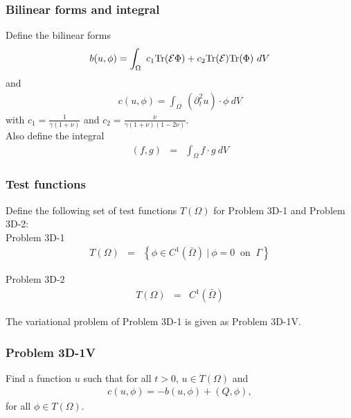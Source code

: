 \documentclass[../../main.tex]{subfiles}ite{VS18}
\begin{document}
\subsubsection{Bilinear forms and integral}\label{sssec:3D_Model:BilinearForm}
Define the bilinear forms
\begin{eqnarray}
	b(u,\phi) = \int_\Omega~c_1\textrm{Tr}({\cal E}\Phi)+ c_2\textrm{Tr}({\cal E})
	\textrm{Tr}(\Phi) ~dV \label{eq:3D_Model:Bilinear}
\end{eqnarray}\label{sym:b}
and
\begin{eqnarray}
	c(u,\phi) = \int_\Omega~ (\partial^2_t u) \cdot \phi~dV \label{eq:3D_Model:Bilinear_c}
\end{eqnarray}
with $\displaystyle c_1 = \frac{1}{\gamma(1+\nu)}$ and $\displaystyle c_2 = \frac{\nu}{\gamma(1+\nu)(1-2\nu)}$.\\

Also define the integral
\begin{eqnarray}
	(f,g) &=& \int_{\Omega} f\cdot g \ dV \label{eq:3D_Model:Bilinear_int}
\end{eqnarray}

\subsubsection{Test functions}\label{sssec:3D_Model:TestFunction}
Define the following set of test functions $T(\Omega)$ for Problem 3D-1 and
Problem 3D-2:\\

Problem 3D-1
\begin{eqnarray*}
	T(\Omega) & = & \left\{ \phi \in C^1(\bar{\Omega}) \ | \ \phi = 0 \ \textrm{ on } \ \Gamma \right\}
\end{eqnarray*}\label{sym:TOmega}

Problem 3D-2
\begin{eqnarray*}
	T(\Omega) & = &  C^1(\bar{\Omega})
\end{eqnarray*}

The variational problem of Problem 3D-1 is given as Problem 3D-1V.

\subsubsection{Problem 3D-1V}\label{sssec:3D_Model:Problem3D1V}
Find a function $u$ such that for all $t>0$, $u \in T(\Omega)$ and
\begin{align}
	c(u,\phi) = -b(u,\phi) + (Q,\phi), \label{eq:3D_Model:Problem3D1VEq}
\end{align}\label{sym:c}
for all $\phi \in T(\Omega)$.\\
\end{document}
